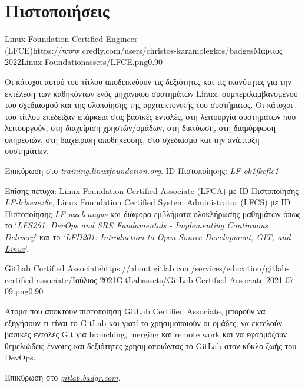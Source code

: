 \documentclass{mycv}
\begin{document}
	\section{Πιστοποιήσεις}
    \begin{EntryDatedLogo}{Linux Foundation Certified Engineer (LFCE)}{https://www.credly.com/users/christos-karamolegkos/badges}{Μάρτιος 2022}{Linux Foundation}{assets/LFCE.png}{0.90}
		\begin{Itemize}
			\item Οι κάτοχοι αυτού του τίτλου αποδεικνύουν τις δεξιότητες και τις ικανότητες για την εκτέλεση των καθηκόντων ενός μηχανικού συστημάτων Linux, συμπεριλαμβανομένου του σχεδιασμού και της υλοποίησης της αρχιτεκτονικής του συστήματος. Οι κάτοχοι του τίτλου επέδειξαν επάρκεια στις βασικές εντολές, στη λειτουργία συστημάτων που λειτουργούν, στη διαχείριση χρηστών/ομάδων, στη δικτύωση, στη διαμόρφωση υπηρεσιών, στη διαχείριση αποθήκευσης, στο σχεδιασμό και την ανάπτυξη συστημάτων.
			\item Επικύρωση στο \href{https://training.linuxfoundation.org/certification/verify-linux-certifications}{\textit{training.linuxfoundation.org}}. ID Πιστοποίησης: \textit{LF-ok1fkcflc1}
			\item Επίσης πέτυχα: Linux Foundation Certified Associate (LFCA) με ID Πιστοποίησης \textit{LF-lrlseaez8c}, Linux Foundation Certified System Administrator (LFCS) με ID Πιστοποίησης \textit{LF-wxclcuugus} και διάφορα εμβλήματα ολοκλήρωσης μαθημάτων όπως το `\href{https://www.credly.com/badges/19ff66ca-2e10-4e1b-90a9-1c1ac6132878}{\textit{LFS261: DevOps and SRE Fundamentals - Implementing Continuous Delivery}}' και το `\href{https://www.credly.com/badges/1fc7edfc-227e-4e93-ac46-297ab05c27db}{\textit{LFD201: Introduction to Open Source Development, GIT, and Linux}}'.
		\end{Itemize}
	\end{EntryDatedLogo}

	\vspace{0.5cm}

    \begin{EntryDatedLogo}{GitLab Certified Associate}{https://about.gitlab.com/services/education/gitlab-certified-associate/}{Ιούλιος 2021}{GitLab}{assets/GitLab-Certified-Associate-2021-07-09.png}{0.90}
		\begin{Itemize}
			\item Άτομα που αποκτούν πιστοποίηση GitLab Certified Associate, μπορούν να εξηγήσουν τι είναι το GitLab και γιατί το χρησιμοποιούν οι ομάδες, να εκτελούν βασικές εντολές Git για branching, merging και remote work και να εφαρμόζουν θεμελιώδεις έννοιες και δεξιότητες χρησιμοποιώντας το GitLab στον κύκλο ζωής του DevOps.
			\item Επικύρωση στο \href{https://gitlab.badgr.com/public/assertions/Hw6j8Th9SyKNj8ehsQkqAw}{\textit{gitlab.badgr.com}}.
		\end{Itemize}
	\end{EntryDatedLogo}
\end{document}
